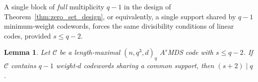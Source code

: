 \documentclass[12pt, letterpaper]{article}
\theoremstyle{plain}
\newtheorem{lemma}[theorem]{Lemma}
\theoremstyle{definition}
\newtheorem{remark}[theorem]{Remark}
\begin{document}

	A single block of \emph{full} multiplicity $q-1$ in the design of Theorem~\ref{thm:zero_set_design}, or equivalently, a single support shared by $q-1$ minimum-weight codewords, forces the same divisibility conditions of linear codes, provided $s \le q-2$.

	\begin{lemma}\label{lem:full_secant_divisibility}
		Let $\mathcal{C}$ be a length-maximal $(n, q^3, d)_q$ $A^s$MDS code with $s \le q-2$. If $\mathcal{C}$ contains $q-1$ weight-$d$ codewords sharing a common support, then $(s+2) \mid q$.
	\end{lemma}
\end{document}
